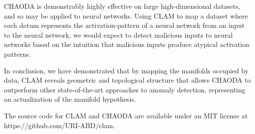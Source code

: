 
CHAODA is demonstrably highly effective on large high-dimensional datasets, and so may be applied to neural networks.
Using CLAM to map a dataset where each datum represents the activation-pattern of a neural network from an input to the neural network, we would expect to detect malicious inputs to neural networks based on the intuition that malicious inputs produce atypical activation patterns.

In conclusion, we have demonstrated that by mapping the manifolds occupied by data, CLAM reveals geometric and topological structure that allows CHAODA to outperform other state-of-the-art approaches to anomaly detection, representing an actualization of the manifold hypothesis.

The source code for CLAM and CHAODA are available under an MIT license at https://github.com/URI-ABD/clam.
